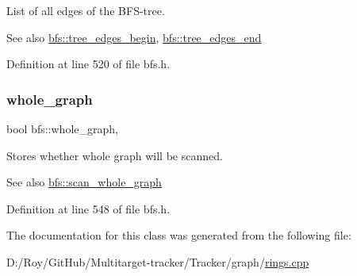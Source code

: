 List of all edges of the B\+F\+S-\/tree. 

\begin{DoxySeeAlso}{See also}
\mbox{\hyperlink{classbfs_a56959215efdfee1a37826ad315ac13e7}{bfs\+::tree\+\_\+edges\+\_\+begin}}, \mbox{\hyperlink{classbfs_a7db47d5d68e21e95fd548beea1a8db2b}{bfs\+::tree\+\_\+edges\+\_\+end}} 
\end{DoxySeeAlso}


Definition at line 520 of file bfs.\+h.

\mbox{\label{classbfs_a6c08fbcc90d71f1cbdd03a1cdaa9dc99}} 
\subsubsection{\texorpdfstring{whole\+\_\+graph}{whole\_graph}}
{\footnotesize\ttfamily bool bfs\+::whole\+\_\+graph\hspace{0.3cm}{\ttfamily [protected]}, {\ttfamily [inherited]}}



Stores whether whole graph will be scanned. 

\begin{DoxySeeAlso}{See also}
\mbox{\hyperlink{classbfs_a25fc51b1bfbbdd3afefe0a84c1bd2f6b}{bfs\+::scan\+\_\+whole\+\_\+graph}} 
\end{DoxySeeAlso}


Definition at line 548 of file bfs.\+h.



The documentation for this class was generated from the following file\+:\begin{DoxyCompactItemize}
\item 
D\+:/\+Roy/\+Git\+Hub/\+Multitarget-\/tracker/\+Tracker/graph/\mbox{\hyperlink{rings_8cpp}{rings.\+cpp}}\end{DoxyCompactItemize}
